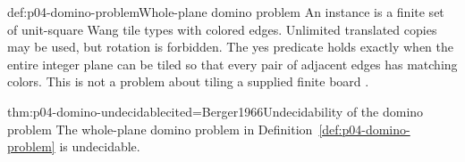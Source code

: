 \begin{hbdefinition}{def:p04-domino-problem}{Whole-plane domino problem}
An instance is a finite set of unit-square Wang tile types with colored
edges.  Unlimited translated copies may be used, but rotation is forbidden.
The yes predicate holds exactly when the entire integer plane can be tiled so
that every pair of adjacent edges has matching colors.  This is not a problem
about tiling a supplied finite board \cite{Wang1961PatternII}.
\end{hbdefinition}

\begin{hbtheorem}{thm:p04-domino-undecidable}{cited=Berger1966}{Undecidability of the domino problem}
The whole-plane domino problem in
Definition~\ref{def:p04-domino-problem} is undecidable.
\end{hbtheorem}

